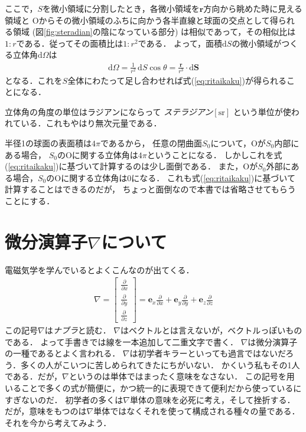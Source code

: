 ここで，$S$を微小領域に分割したとき，各微小領域を$\bm{r}$方向から眺めた時に見える領域と
Oからその微小領域のふちに向かう各半直線と球面の交点として得られる領域
(図\ref{fig:steradian}の陰になっている部分)
は相似であって，その相似比は$1 : r$である．従ってその面積比は$1 : r^2$である．
よって，面積$\mathrm{d}S$の微小領域がつくる立体角$\mathrm{d} \Omega$は
\begin{align}
\mathrm{d} \Omega = \frac{1}{r^2} \, \mathrm{d} S \cos \theta
= \frac{\bm{r}}{r^3} \cdot \mathrm{d} \bm{S} 
\label{eq:bisyouomega}
\end{align}
となる．これを$S$全体にわたって足し合わせれば式(\ref{eq:ritaikaku})が得られることになる．

立体角の角度の単位はラジアンにならって
\emph{ステラジアン}$[\mathrm{sr}]$
という単位が使われている．これもやはり無次元量である．

半径1の球面の表面積は$4 \pi$であるから，
任意の閉曲面$S_0$について，Oが$S_0$内部にある場合，
$S_0$のOに関する立体角は$4 \pi$ということになる．
しかしこれを式(\ref{eq:ritaikaku})に基づいて計算するのは少し面倒である．
また，Oが$S_0$外部にある場合，$S_0$のOに関する立体角は0になる．
これも式(\ref{eq:ritaikaku})に基づいて計算することはできるのだが，
ちょっと面倒なので本書では省略させてもらうことにする．


\section{微分演算子$\nabla$について}
電磁気学を学んでいるとよくこんなのが出てくる．
\begin{align}
\nabla = \left[
 \begin{array}{c}
\displaystyle
\frac{\partial}{\partial x} \\
\displaystyle
\frac{\partial}{\partial y} \\
\displaystyle
\frac{\partial}{\partial z} 
 \end{array}
\right] 
= \bm{e}_x \frac{\partial}{\partial x} + \bm{e}_y \frac{\partial}{\partial y} 
+ \bm{e}_z \frac{\partial}{\partial z}
\label{eq:nabla}
\end{align}
この記号$\nabla$は\emph{ナブラ}と読む．
$\nabla$はベクトルとは言えないが，ベクトルっぽいものである．
よって手書きでは線を一本追加して二重文字で書く．
$\nabla$は微分演算子の一種であるとよく言われる．
$\nabla$は初学者キラーといっても過言ではないだろう．多くの人がこいつに苦しめられてきたにちがいない．
かくいう私もその1人である．だが，$\nabla$というのは単体ではまったく意味をなさない．
この記号を用いることで多くの式が簡便に，かつ統一的に表現できて便利だから使っているにすぎないのだ．
初学者の多くは$\nabla$単体の意味を必死に考え，そして挫折する．
だが，意味をもつのは$\nabla$単体ではなくそれを使って構成される種々の量である．
それを今から考えてみよう．
